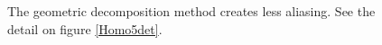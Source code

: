 \begin{figure}
\caption{The geometric decomposition method creates less aliasing. See the detail on figure \ref{Homo5det}.}
\label{Homo5}
\end{figure}

